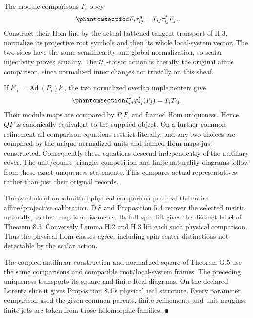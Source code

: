 \documentclass[
  english,
  11pt,
  reqno]{amsart}
\begin{document}
The module comparisons \(F_i\) obey
\begin{equation}\protect\phantomsection\label{eq:gg-independent-op-module-counit}{
 F_i\tau^s_{ij}=T_{ij}\tau^t_{ij}F_j .
}\end{equation} Construct their Hom line by the actual flattened tangent
transport of H.3, normalize its projective root symbols and then its
whole local-system vector. The two sides have the same semilinearity and
global normalization, so scalar injectivity proves equality. The
\(\mathscr U_1\)-torsor action is literally the original affine
comparison, since normalized inner changes act trivially on this sheaf.

If \(k'_i=\operatorname{Ad}(P_i)k_i\), the two normalized overlap
implementers give
\begin{equation}\protect\phantomsection\label{eq:gg-independent-op-counit-uniqueness}{
 T'_{ij}\varphi^t_{ij}(P_j)=P_iT_{ij}.
}\end{equation} Their module maps are compared by \(P_iF_i\) and framed
Hom uniqueness. Hence \(QF\) is canonically equivalent to the supplied
object. On a further common refinement all comparison equations restrict
literally, and any two choices are compared by the unique normalized
units and framed Hom maps just constructed. Consequently these equations
descend independently of the auxiliary cover. The unit/counit triangle,
composition and finite naturality diagrams follow from these exact
uniqueness statements. This compares actual representatives, rather than
just their original records.

The symbols of an admitted physical comparison preserve the entire
affine/projective calibration. D.8 and Proposition 5.4 recover the
selected metric naturally, so that map is an isometry. Its full spin
lift gives the distinct label of Theorem 8.3. Conversely Lemma H.2 and
H.3 lift each such physical comparison. Thus the physical Hom classes
agree, including spin-center distinctions not detectable by the scalar
action.

The coupled antilinear construction and normalized square of Theorem G.5
use the same comparisons and compatible root/local-system frames. The
preceding uniqueness transports its square and finite Real diagrams. On
the declared Lorentz slice it gives Proposition 8.4's physical real
structure. Every parameter comparison used the given common parents,
finite refinements and unit margins; finite jets are taken from those
holomorphic families. ∎

\protect{}\label{sec:gg-independent-op-active-comparison}
\end{document}
